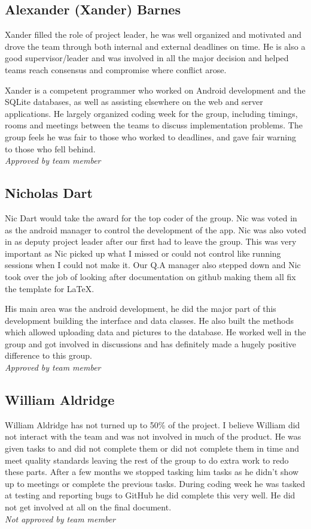 \subsection{Alexander (Xander) Barnes}
    Xander filled the role of project leader, he was well organized and motivated and drove the team through both internal and external deadlines on time. He is also a good supervisor/leader and was involved in all the major decision and helped teams reach consensus and compromise where conflict arose.

    Xander is a competent programmer who worked on Android development and the SQLite databases, as well as assisting elsewhere on the web and server applications. He largely organized coding week for the group, including timings, rooms and meetings between the teams to discuss implementation problems. The group feels he was fair to those who worked to deadlines, and gave fair warning to those who fell behind.\\
    \emph{Approved by team member}

\subsection{Nicholas Dart}
    Nic Dart would take the award for the top coder of the group. Nic was voted in as the android manager to control the development of the app. Nic was also voted in as deputy project leader after our first had to leave the group. This was very important as Nic picked up what I missed or could not control like running sessions when I could not make it. Our Q.A manager also stepped down and Nic took over the job of looking after documentation on github making them all fix the template for \LaTeX.

    His main area was the android development, he did the major part of this development building the interface and data classes. He also built the methods which allowed uploading data and pictures to the database. He worked well in the group and got involved in discussions and has definitely made a hugely positive difference to this group.\\
    \emph{Approved by team member}
    
\subsection{William Aldridge}
    William Aldridge has not turned up to 50\% of the project. I believe William did not interact with the team and was not involved in much of the product. He was given tasks to and did not complete them or did not complete them in time and meet quality standards leaving the rest of the group to do extra work to redo these parts. After a few months we stopped tasking him tasks as he didn't show up to meetings or complete the previous tasks. During coding week he was tasked at testing and reporting bugs to GitHub he did complete this very well. He did not get involved at all on the final document.\\
    \emph{Not approved by team member}

